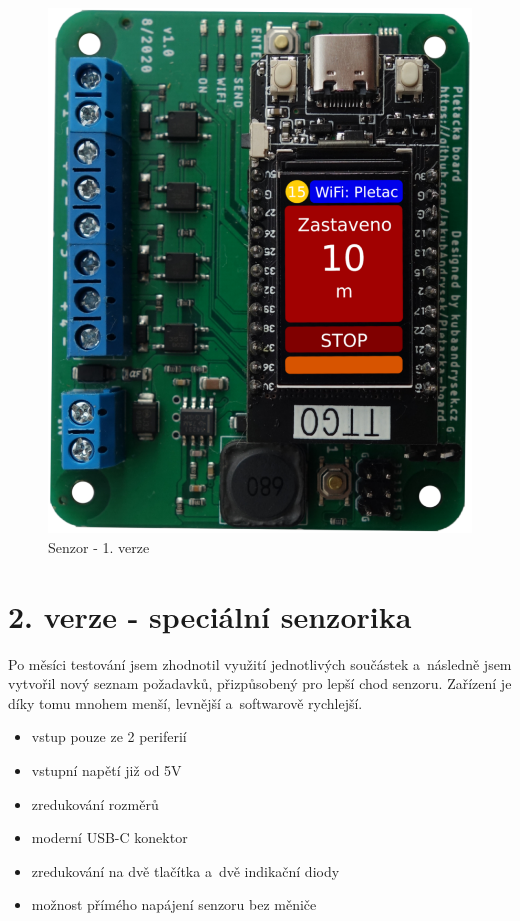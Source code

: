 \begin{figure}[htbp]
    \centering
    \includegraphics[width=\textwidth/2]{img/V1-deska-esp-screen.png}
    \caption{Senzor - 1. verze}
    \label{fig:SenzorV1}
\end{figure}


\newpage



\section{2. verze - speciální senzorika}

Po měsíci testování jsem zhodnotil využití jednotlivých součástek a~následně jsem vytvořil nový seznam požadavků, přizpůsobený pro lepší chod senzoru.
Zařízení je díky tomu mnohem menší, levnější a~softwarově rychlejší.

\begin{itemize}
    \item vstup pouze ze 2 periferií
    \item vstupní napětí již od 5V
    \item zredukování rozměrů
    \item moderní USB-C konektor
    \item zredukování na dvě tlačítka a~dvě indikační diody
    \item možnost přímého napájení senzoru bez měniče
\end{itemize}

